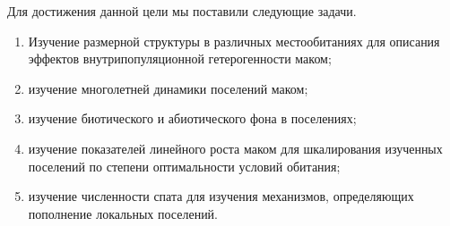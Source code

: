 Для достижения данной цели мы поставили следующие задачи.
  \begin{enumerate}
    \item Изучение размерной %
структуры в различных местообитаниях для описания эффектов внутрипопуляционной гетерогенности маком;
    \item изучение многолетней динамики поселений маком;
    \item изучение биотического и абиотического фона в поселениях;
    \item изучение показателей линейного роста маком для шкалирования изученных поселений по степени оптимальности условий обитания;
    \item изучение численности спата для изучения механизмов, определяющих пополнение локальных поселений.
  \end{enumerate}




